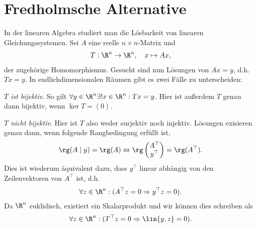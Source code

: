 \section{Fredholmsche Alternative}

In der linearen Algebra studiert man die Lösbarkeit von linearen
Gleichungssystemen. Sei $A$ eine reelle $n\times n$-Matrix und
\begin{align*}
T: \R^n\to\R^n,\quad x\mapsto Ax,
\end{align*}
der zugehörige Homomorphismus. Gesucht sind nun Lösungen von $Ax=y$, d.h.
$Tx=y$. In endlichdimensionalen Räumen gibt es zwei Fälle zu unterscheiden:
\begin{propenum}
  \item \textit{$T$ ist bijektiv}. So gilt $\forall y\in\R^n \exists ! x\in\R^n
  : Tx=y$. Hier ist außerdem $T$ genau dann bijektiv, wenn $\ker T = (0)$.
  \item \textit{$T$ nicht bijektiv}. Hier ist $T$ also weder surjektiv
  noch injektiv. Lösungen exisieren genau dann, wenn folgende Rangbedingung erfüllt
  ist,
\begin{align*}
\rg(A\mid y) = \rg(A) \Leftrightarrow
\rg\begin{pmatrix}
   A^\top \\ y^\top
   \end{pmatrix}
= \rg(A^\top).
\end{align*}
Dies ist wiederum äquivalent dazu, dass $y^\top$ linear abhängig von den
Zeilenvektoren von $A^\top$ ist, d.h.
\begin{align*}
\forall z\in\R^n : (A^\top z = 0\Rightarrow y^\top z = 0).
\end{align*}
Da $\R^n$ euklidisch, existiert ein Skalarprodukt und wir können dies
schreiben als
\begin{align*}
\forall z\in\R^n : (T^\top z = 0\Rightarrow \lin{y,z} = 0).
\end{align*}
\end{propenum}

